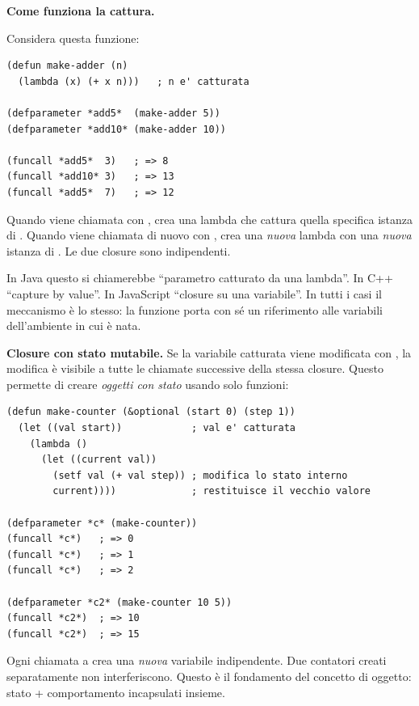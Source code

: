 \begin{tcolorbox}[
  enhanced,
  colback=black!2, colframe=black!20,
  arc=3pt, boxrule=0.4pt,
  left=12pt, right=12pt, top=9pt, bottom=9pt,
  before skip=8pt, after skip=10pt
]
\small\color{black!65}

\textbf{Come funziona la cattura.}

\medskip
Considera questa funzione:

\begin{tcolorbox}[
  enhanced, colback=clBg, colframe=gray!40,
  arc=2pt, boxrule=0.4pt,
  left=8pt, right=6pt, top=4pt, bottom=4pt,
  before skip=4pt, after skip=4pt
]
\begin{lstlisting}
(defun make-adder (n)
  (lambda (x) (+ x n)))   ; n e' catturata

(defparameter *add5*  (make-adder 5))
(defparameter *add10* (make-adder 10))

(funcall *add5*  3)   ; => 8
(funcall *add10* 3)   ; => 13
(funcall *add5*  7)   ; => 12
\end{lstlisting}
\end{tcolorbox}

Quando  viene chiamata con , crea una lambda
che cattura quella specifica istanza di .
Quando  viene chiamata di nuovo con ,
crea una \emph{nuova} lambda con una \emph{nuova} istanza di .
Le due closure sono indipendenti.

\medskip
In Java questo si chiamerebbe ``parametro catturato da una lambda''.
In C++ ``capture by value''. In JavaScript ``closure su una variabile''.
In tutti i casi il meccanismo è lo stesso: la funzione porta con sé
un riferimento alle variabili dell'ambiente in cui è nata.

\medskip
\textbf{Closure con stato mutabile.}
Se la variabile catturata viene modificata con , la modifica
è visibile a tutte le chiamate successive della stessa closure.
Questo permette di creare \emph{oggetti con stato} usando solo funzioni:

\begin{tcolorbox}[
  enhanced, colback=clBg, colframe=gray!40,
  arc=2pt, boxrule=0.4pt,
  left=8pt, right=6pt, top=4pt, bottom=4pt,
  before skip=4pt, after skip=4pt
]
\begin{lstlisting}
(defun make-counter (&optional (start 0) (step 1))
  (let ((val start))            ; val e' catturata
    (lambda ()
      (let ((current val))
        (setf val (+ val step)) ; modifica lo stato interno
        current))))             ; restituisce il vecchio valore

(defparameter *c* (make-counter))
(funcall *c*)   ; => 0
(funcall *c*)   ; => 1
(funcall *c*)   ; => 2

(defparameter *c2* (make-counter 10 5))
(funcall *c2*)  ; => 10
(funcall *c2*)  ; => 15
\end{lstlisting}
\end{tcolorbox}

Ogni chiamata a  crea una \emph{nuova} variabile 
indipendente. Due contatori creati separatamente non interferiscono.
Questo è il fondamento del concetto di oggetto: stato + comportamento
incapsulati insieme.
\end{tcolorbox}

